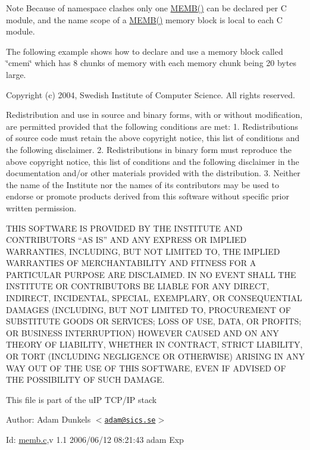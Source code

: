 \begin{DoxyNote}{Note}
Because of namespace clashes only one \hyperlink{group__telnetd_ga8505bcbff8774c99458a328d8d2e9bc0}{MEMB()} can be declared per C module, and the name scope of a \hyperlink{group__telnetd_ga8505bcbff8774c99458a328d8d2e9bc0}{MEMB()} memory block is local to each C module.
\end{DoxyNote}
The following example shows how to declare and use a memory block called \char`\"{}cmem\char`\"{} which has 8 chunks of memory with each memory chunk being 20 bytes large.

Copyright (c) 2004, Swedish Institute of Computer Science. All rights reserved.

Redistribution and use in source and binary forms, with or without modification, are permitted provided that the following conditions are met: 1. Redistributions of source code must retain the above copyright notice, this list of conditions and the following disclaimer. 2. Redistributions in binary form must reproduce the above copyright notice, this list of conditions and the following disclaimer in the documentation and/or other materials provided with the distribution. 3. Neither the name of the Institute nor the names of its contributors may be used to endorse or promote products derived from this software without specific prior written permission.

THIS SOFTWARE IS PROVIDED BY THE INSTITUTE AND CONTRIBUTORS ``AS IS'' AND ANY EXPRESS OR IMPLIED WARRANTIES, INCLUDING, BUT NOT LIMITED TO, THE IMPLIED WARRANTIES OF MERCHANTABILITY AND FITNESS FOR A PARTICULAR PURPOSE ARE DISCLAIMED. IN NO EVENT SHALL THE INSTITUTE OR CONTRIBUTORS BE LIABLE FOR ANY DIRECT, INDIRECT, INCIDENTAL, SPECIAL, EXEMPLARY, OR CONSEQUENTIAL DAMAGES (INCLUDING, BUT NOT LIMITED TO, PROCUREMENT OF SUBSTITUTE GOODS OR SERVICES; LOSS OF USE, DATA, OR PROFITS; OR BUSINESS INTERRUPTION) HOWEVER CAUSED AND ON ANY THEORY OF LIABILITY, WHETHER IN CONTRACT, STRICT LIABILITY, OR TORT (INCLUDING NEGLIGENCE OR OTHERWISE) ARISING IN ANY WAY OUT OF THE USE OF THIS SOFTWARE, EVEN IF ADVISED OF THE POSSIBILITY OF SUCH DAMAGE.

This file is part of the uIP TCP/IP stack

Author: Adam Dunkels $<$\href{mailto:adam@sics.se}{\tt adam@sics.se}$>$

\begin{DoxyParagraph}{Id:}
\hyperlink{memb_8c}{memb.c},v 1.1 2006/06/12 08:21:43 adam Exp 
\end{DoxyParagraph}



